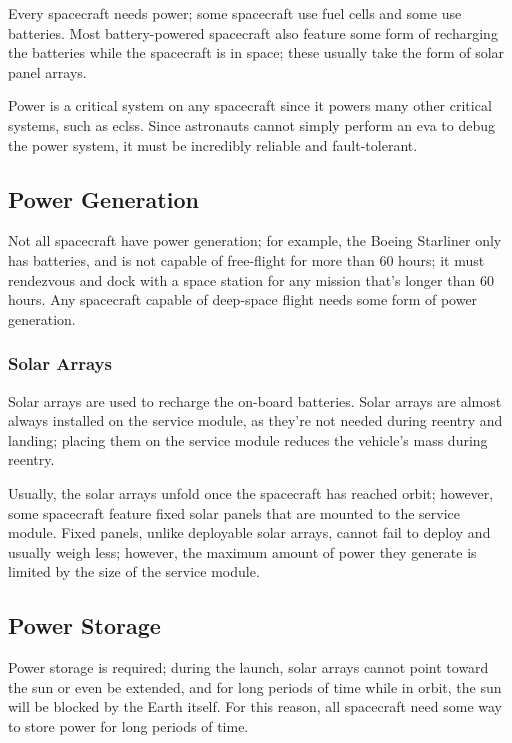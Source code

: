 Every spacecraft needs power; some spacecraft use fuel cells and some
use batteries. Most battery-powered spacecraft also feature some form
of recharging the batteries while the spacecraft is in space; these
usually take the form of solar panel arrays.

Power is a critical system on any spacecraft since it powers many
other critical systems, such as \acrshort{eclss}. Since astronauts
cannot simply perform an \acrshort{eva} to debug the power system, it
must be incredibly reliable and fault-tolerant.

\subsection{Power Generation}

Not all spacecraft have power generation; for example, the Boeing
Starliner only has batteries, and is not capable of free-flight for
more than 60 hours; it must rendezvous and dock with a space station
for any mission that's longer than 60 hours. Any spacecraft capable of
deep-space flight needs some form of power generation.

\subsubsection{Solar Arrays}

Solar arrays are used to recharge the on-board batteries. Solar arrays
are almost always installed on the service module, as they're not
needed during reentry and landing; placing them on the service module
reduces the vehicle's mass during reentry.

Usually, the solar arrays unfold once the spacecraft has reached
orbit; however, some spacecraft feature fixed solar panels that are
mounted to the service module. Fixed panels, unlike deployable solar
arrays, cannot fail to deploy and usually weigh less; however, the
maximum amount of power they generate is limited by the size of the
service module.

\subsection{Power Storage}

Power storage is required; during the launch, solar arrays cannot
point toward the sun or even be extended, and for long periods of time
while in orbit, the sun will be blocked by the Earth itself. For this
reason, all spacecraft need some way to store power for long periods
of time.

